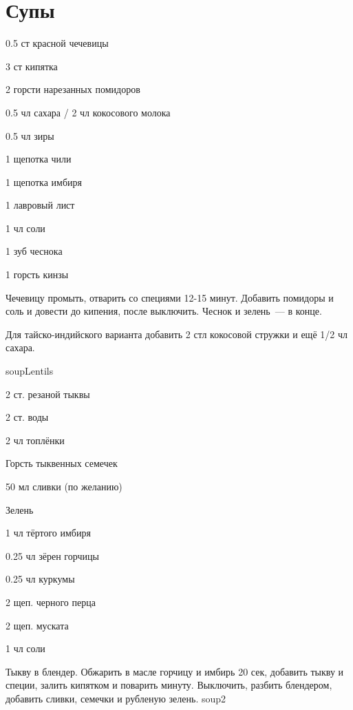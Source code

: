 
\chapter*{Супы}
\label{sec:soup}



{
\item 0.5 ст красной чечевицы
\item 3 ст кипятка
\item 2 горсти нарезанных помидоров
}{
\item 0.5 чл сахара / 2 чл кокосового молока
\item 0.5 чл зиры
\item 1 щепотка чили
\item 1 щепотка имбиря
\item 1 лавровый лист
\item 1 чл соли
\item 1 зуб чеснока
\item 1 горсть кинзы
}{
Чечевицу промыть, отварить со специями 12-15 минут. Добавить помидоры и соль и довести до кипения, после выключить. Чеснок и зелень~--- в конце. %
}{
\begin{advice}
\item Для тайско-индийского варианта добавить 2 стл кокосовой стружки и ещё 1/2 чл сахара.
\end{advice}}{soupLentils}




{
\item 2 ст. резаной тыквы
\item 2 ст. воды
\item 2 чл топлёнки
\item Горсть тыквенных семечек 
\item 50 мл сливки (по желанию)
\item Зелень
}{
\item 1 чл тёртого имбиря
\item 0.25 чл зёрен горчицы
\item 0.25 чл куркумы
\item 2 щеп. черного перца
\item 2 щеп. муската
\item 1 чл соли
}
{
Тыкву в блендер. Обжарить в масле горчицу и имбирь 20 сек, добавить тыкву и специи, залить кипятком и поварить минуту. Выключить, разбить блендером, добавить сливки, семечки и рубленую зелень. 
}{}{soup2}

